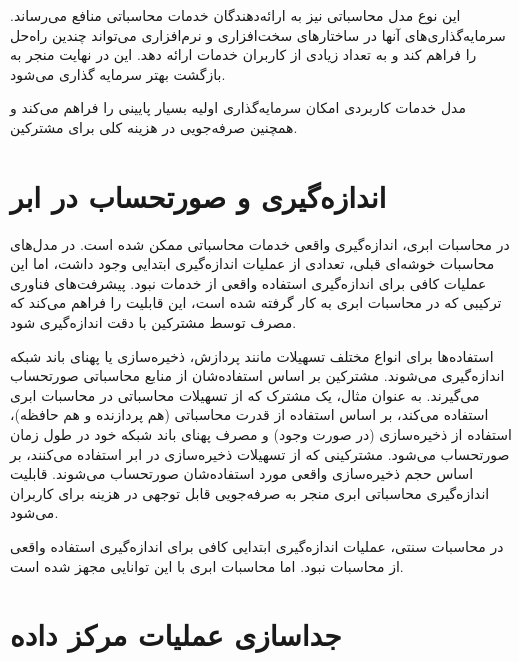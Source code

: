 \documentclass{book}
\begin{document}
                این نوع مدل محاسباتی نیز به ارائه‌دهندگان خدمات محاسباتی منافع می‌رساند. سرمایه‌گذاری‌های آنها در ساختارهای سخت‌افزاری و نرم‌افزاری می‌تواند چندین راه‌حل را فراهم کند و به تعداد زیادی از کاربران خدمات ارائه دهد. این در نهایت منجر به بازگشت بهتر سرمایه گذاری می‌شود.

                \begin{addinfo}
                    
                    مدل خدمات کاربردی امکان سرمایه‌گذاری اولیه بسیار پایینی را فراهم می‌کند و همچنین صرفه‌جویی در هزینه کلی برای مشترکین.

                \end{addinfo}

        \section{اندازه‌گیری و صورتحساب در ابر}

            در محاسبات ابری، اندازه‌گیری واقعی خدمات محاسباتی ممکن شده است. در مدل‌های محاسبات خوشه‌ای قبلی، تعدادی از عملیات اندازه‌گیری ابتدایی وجود داشت، اما این عملیات کافی برای اندازه‌گیری استفاده واقعی از خدمات نبود. پیشرفت‌های فناوری ترکیبی که در محاسبات ابری به کار گرفته شده است، این قابلیت را فراهم می‌کند که مصرف توسط مشترکین با دقت اندازه‌گیری شود.

            استفاده‌ها برای انواع مختلف تسهیلات مانند پردازش، ذخیره‌سازی یا پهنای باند شبکه اندازه‌گیری می‌شوند. مشترکین بر اساس استفاده‌شان از منابع محاسباتی صورتحساب می‌گیرند. به عنوان مثال، یک مشترک که از تسهیلات محاسباتی در محاسبات ابری استفاده می‌کند، بر اساس استفاده از قدرت محاسباتی (هم پردازنده و هم حافظه)، استفاده از ذخیره‌سازی (در صورت وجود) و مصرف پهنای باند شبکه خود در طول زمان صورتحساب می‌شود. مشترکینی که از تسهیلات ذخیره‌سازی در ابر استفاده می‌کنند، بر اساس حجم ذخیره‌سازی واقعی مورد استفاده‌شان صورتحساب می‌شوند. قابلیت اندازه‌گیری محاسباتی ابری منجر به صرفه‌جویی قابل توجهی در هزینه برای کاربران می‌شود.

            \begin{addinfo}
                
                در محاسبات سنتی، عملیات اندازه‌گیری ابتدایی کافی برای اندازه‌گیری استفاده واقعی از محاسبات نبود. اما محاسبات ابری با این توانایی مجهز شده است.

            \end{addinfo}

        \section{جداسازی عملیات مرکز داده}
\end{document}
